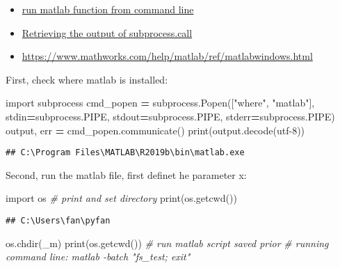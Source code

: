 \documentclass[
]{book}
\newenvironment{Shaded}{\begin{snugshade}}{\end{snugshade}}
\newcommand{\BuiltInTok}[1]{#1}
\newcommand{\CommentTok}[1]{\textcolor[rgb]{0.56,0.35,0.01}{\textit{#1}}}
\newcommand{\ImportTok}[1]{#1}
\newcommand{\NormalTok}[1]{#1}
\newcommand{\OperatorTok}[1]{\textcolor[rgb]{0.81,0.36,0.00}{\textbf{#1}}}
\newcommand{\StringTok}[1]{\textcolor[rgb]{0.31,0.60,0.02}{#1}}
\providecommand{\tightlist}{%
  \setlength{\itemsep}{0pt}\setlength{\parskip}{0pt}}
\begin{document}
\begin{itemize}
\tightlist
\item
  \href{https://www.mathworks.com/matlabcentral/answers/327116-run-function-from-command-line}{run matlab function from command line}
\item
  \href{https://stackoverflow.com/a/1996540/8280804}{Retrieving the output of subprocess.call}
\item
  \url{https://www.mathworks.com/help/matlab/ref/matlabwindows.html}
\end{itemize}

First, check where matlab is installed:

\begin{Shaded}
\begin{Highlighting}[]
\ImportTok{import}\NormalTok{ subprocess}
\NormalTok{cmd\_popen }\OperatorTok{=}\NormalTok{ subprocess.Popen([}\StringTok{"where"}\NormalTok{, }\StringTok{"matlab"}\NormalTok{],}
\NormalTok{                             stdin}\OperatorTok{=}\NormalTok{subprocess.PIPE,}
\NormalTok{                             stdout}\OperatorTok{=}\NormalTok{subprocess.PIPE,}
\NormalTok{                             stderr}\OperatorTok{=}\NormalTok{subprocess.PIPE)}
\NormalTok{output, err }\OperatorTok{=}\NormalTok{ cmd\_popen.communicate()}
\BuiltInTok{print}\NormalTok{(output.decode(}\StringTok{\textquotesingle{}utf{-}8\textquotesingle{}}\NormalTok{))}
\end{Highlighting}
\end{Shaded}

\begin{verbatim}
## C:\Program Files\MATLAB\R2019b\bin\matlab.exe
\end{verbatim}

Second, run the matlab file, first definet he parameter x:

\begin{Shaded}
\begin{Highlighting}[]
\ImportTok{import}\NormalTok{ os}
\CommentTok{\# print and set directory}
\BuiltInTok{print}\NormalTok{(os.getcwd())}
\end{Highlighting}
\end{Shaded}

\begin{verbatim}
## C:\Users\fan\pyfan
\end{verbatim}

\begin{Shaded}
\begin{Highlighting}[]
\NormalTok{os.chdir(}\StringTok{\textquotesingle{}\_m\textquotesingle{}}\NormalTok{)}
\BuiltInTok{print}\NormalTok{(os.getcwd())}
\CommentTok{\# run matlab script saved prior}
\CommentTok{\# running command line: matlab {-}batch "fs\_test; exit"}
\end{Highlighting}
\end{Shaded}
\end{document}
